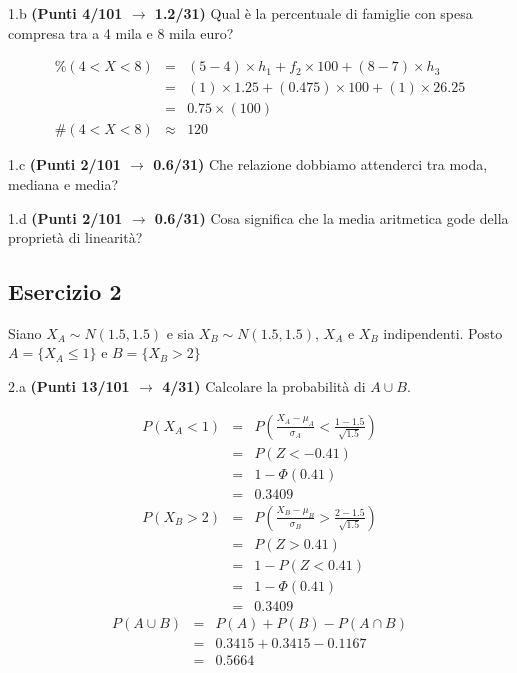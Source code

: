 \documentclass[
  11pt,
]{book}
\theoremstyle{mytheoremstyle}
\theoremstyle{mydefstyle}
\newenvironment{sol}
  {
  \begin{tcolorbox}[enhanced,breakable,arc=0.1mm,boxrule=1pt,colback=white,colframe=iblue,
  title=\bf \fontfamily{lmss}\selectfont \hspace{.5 cm} Soluzione,drop fuzzy shadow]

}{
\end{tcolorbox}
  }
\begin{document}
1.b \textbf{(Punti 4/101 \(\rightarrow\) 1.2/31)} Qual è la percentuale di famiglie con spesa compresa tra a 4 mila e 8 mila euro?

\begin{sol}
\begin{eqnarray*} \%(4<X<8) &=& (5-4)\times h_{1}+ f_{ 2 }\times 100 + (8-7)\times h_{3}  \\ 
 &=& (1)\times 1.25+ ( 0.475 )\times 100 + (1)\times 26.25  \\ 
 &=&  0.75 \times(100)\\
     \#( 4 < X < 8 ) &\approx& 120 
         \end{eqnarray*}

\end{sol}

1.c \textbf{(Punti 2/101 \(\rightarrow\) 0.6/31)} Che relazione dobbiamo attenderci tra moda, mediana e media?

1.d \textbf{(Punti 2/101 \(\rightarrow\) 0.6/31)} Cosa significa che la media aritmetica gode della proprietà di linearità?

\subsection{Esercizio 2}\label{esercizio-2-26}

Siano \(X_A\sim N(1.5,1.5)\) e sia \(X_B\sim N(1.5,1.5)\), \(X_A\) e \(X_B\) indipendenti. Posto \(A=\{X_A\le 1\}\) e \(B=\{X_B>2\}\)

2.a \textbf{(Punti 13/101 \(\rightarrow\) 4/31)} Calcolare la probabilità di \(A\cup B\).

\begin{sol}
\begin{eqnarray*}
      P( X_A   <   1 ) 
        &=& P\left(  \frac { X_A  -  \mu_A }{ \sigma_A }  <  \frac { 1  -  1.5 }{\sqrt{ 1.5 }} \right)  \\
                 &=& P\left(  Z   <   -0.41 \right) \\    
                 &=&  1-\Phi( 0.41 ) \\ &=&  0.3409 
      \end{eqnarray*}\begin{eqnarray*}
      P( X_B   >   2 ) 
        &=& P\left(  \frac { X_B  -  \mu_B }{ \sigma_B }  >  \frac { 2  -  1.5 }{\sqrt{ 1.5 }} \right)  \\
                 &=& P\left(  Z   >   0.41 \right) \\    &=& 1-P(Z< 0.41 )\\ 
                 &=&  1-\Phi( 0.41 ) \\ &=&  0.3409 
      \end{eqnarray*}
\begin{eqnarray*}
  P(A\cup B) &=&  P(A)+P(B)-P(A\cap B)\\
  &=& 0.3415+0.3415-0.1167\\
  &=& 0.5664
\end{eqnarray*}

\end{sol}
\end{document}
